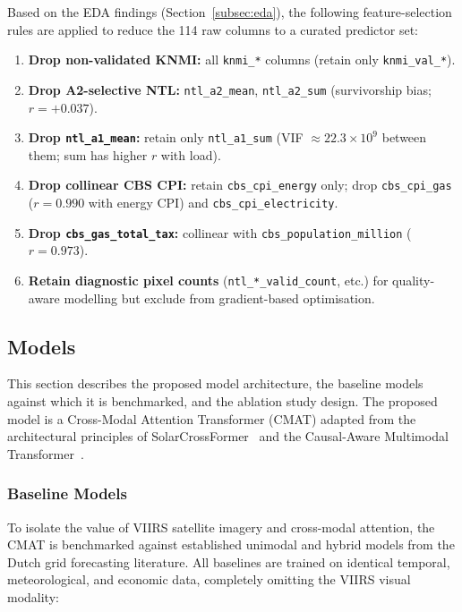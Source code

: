 Based on the EDA findings (Section~\ref{subsec:eda}), the following feature-selection rules are applied to reduce the 114 raw columns to a curated predictor set:

\begin{enumerate}
    \item \textbf{Drop non-validated KNMI:} all \texttt{knmi\_*} columns (retain only \texttt{knmi\_val\_*}).
    \item \textbf{Drop A2-selective NTL:} \texttt{ntl\_a2\_mean}, \texttt{ntl\_a2\_sum} (survivorship bias; $r = +0.037$).
    \item \textbf{Drop \texttt{ntl\_a1\_mean}:} retain only \texttt{ntl\_a1\_sum} (VIF $\approx 22.3 \times 10^9$ between them; sum has higher $r$ with load).
    \item \textbf{Drop collinear CBS CPI:} retain \texttt{cbs\_cpi\_energy} only; drop \texttt{cbs\_cpi\_gas} ($r = 0.990$ with energy CPI) and \texttt{cbs\_cpi\_electricity}.
    \item \textbf{Drop \texttt{cbs\_gas\_total\_tax}:} collinear with \texttt{cbs\_population\_million} ($r = 0.973$).
    \item \textbf{Retain diagnostic pixel counts} (\texttt{ntl\_*\_valid\_count}, etc.) for quality-aware modelling but exclude from gradient-based optimisation.
\end{enumerate}


\subsection{Models}
\label{subsec:models}

This section describes the proposed model architecture, the baseline models against which it is benchmarked, and the ablation study design. The proposed model is a Cross-Modal Attention Transformer (CMAT) adapted from the architectural principles of SolarCrossFormer~\cite{schubnel_solarcrossformer_2025} and the Causal-Aware Multimodal Transformer~\cite{wang_causal-aware_2025}.

\subsubsection{Baseline Models}
\label{subsubsec:baselines}

To isolate the value of VIIRS satellite imagery and cross-modal attention, the CMAT is benchmarked against established unimodal and hybrid models from the Dutch grid forecasting literature. All baselines are trained on identical temporal, meteorological, and economic data, completely omitting the VIIRS visual modality:

